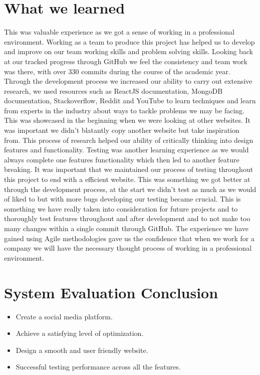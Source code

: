 \section{What we learned}
This was valuable experience as we got a sense of working in a professional environment. Working as a team to produce this project has helped us to develop and improve on our team working skills and problem solving skills. Looking back at our tracked progress through GitHub we feel the consistency and team work was there, with over 330 commits during the course of the academic year. Through the development process we increased our ability to carry out extensive research, we used resources such as ReactJS documentation, MongoDB documentation, Stackoverflow, Reddit and YouTube to learn techniques and learn from experts in the industry about ways to tackle problems we may be facing. This was showcased in the beginning when we were looking at other websites. It was important we didn't blatantly copy another website but take inspiration from. This process of research helped our ability of critically thinking into design features and functionality. 
Testing was another learning experience as we would always complete one features functionality which then led to another feature breaking. It was important that we maintained our process of testing throughout this project to end with a efficient website. This was something we got better at through the development process, at the start we didn't test as much as we would of liked to but with more bugs developing our testing became crucial. This is something we have really taken into consideration for future projects and to thoroughly test features throughout and after development and to not make too many changes within a single commit through GitHub.
The experience we have gained using Agile methodologies gave us the confidence that when we work for a company we will have the necessary thought process of working in a professional environment. 

\section{System Evaluation Conclusion}
\begin{itemize}
    \item Create a social media platform.
    \item Achieve a satisfying level of optimization.
    \item Design a smooth and user friendly website.
    \item Successful testing performance across all the features.
\end{itemize}

